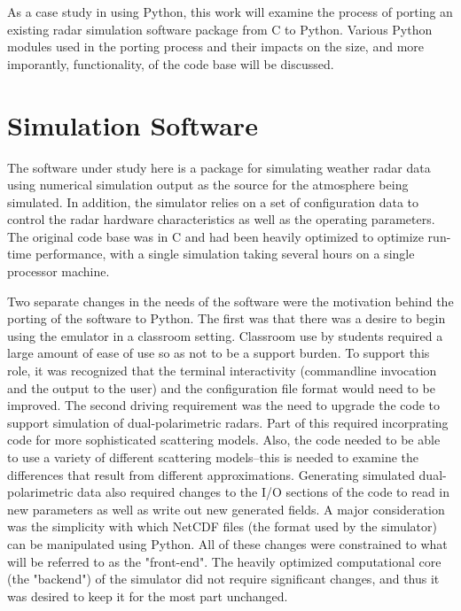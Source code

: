\documentclass[twocolumn]{article}
\begin{document}
As a case study in using Python, this work will examine the process of porting an existing
radar simulation software package from C to Python.  Various Python modules used in the
porting process and their impacts on the size, and more imporantly, functionality, of the
code base will be discussed.

\section{Simulation Software}
The software under study here is a package for simulating weather radar data using
numerical simulation output as the source for the atmosphere being simulated. In addition,
the simulator relies on a set of configuration data to control the radar hardware
characteristics as well as the operating parameters. The original code base was in C
and had been heavily optimized to optimize run-time performance, with a single simulation
taking several hours on a single processor machine.

Two separate changes in the needs of the software were the motivation behind the porting
of the software to Python. The first was that there was a desire to begin using the
emulator in a classroom setting. Classroom use by students required a large amount
of ease of use so as not to be a support burden.  To support this role, it was
recognized that the terminal interactivity (commandline invocation and the output
to the user) and the configuration file format would need to be improved. The second
driving requirement was the need to upgrade the code to support simulation of
dual-polarimetric radars. Part of this required  incorprating code for more
sophisticated scattering models. Also, the code needed to be able to use a variety of different scattering
models--this is needed to examine the differences that result from different approximations.
Generating simulated dual-polarimetric data also required changes to the I/O
sections of the code to read in new parameters as well as write out new generated
fields. A major consideration was the simplicity with which NetCDF files (the 
format used by the simulator) can be manipulated using Python.
All of these changes were constrained to what will be referred to as the "front-end". The
heavily optimized computational core (the "backend") of the simulator did not require significant
changes, and thus it was desired to keep it for the most part unchanged.
\end{document}

